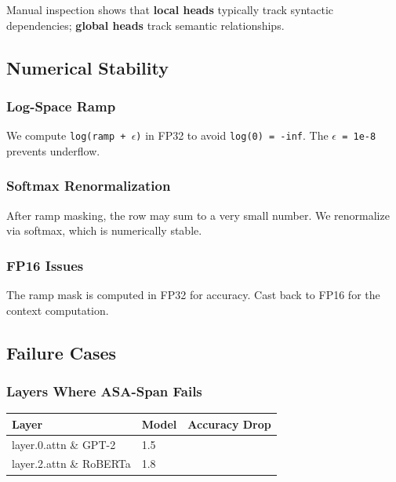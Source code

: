 Manual inspection shows that \textbf{local heads} typically track syntactic 
dependencies; \textbf{global heads} track semantic relationships.

\subsection{Numerical Stability}

\subsubsection{Log-Space Ramp}

We compute \texttt{log(ramp + $\epsilon$)} in FP32 to avoid \texttt{log(0) = -inf}. The \texttt{$\epsilon$ = 1e-8} 
prevents underflow.

\subsubsection{Softmax Renormalization}

After ramp masking, the row may sum to a very small number. We renormalize 
via softmax, which is numerically stable.

\subsubsection{FP16 Issues}

The ramp mask is computed in FP32 for accuracy. Cast back to FP16 for the 
context computation.

\subsection{Failure Cases}

\subsubsection{Layers Where ASA-Span Fails}

\begin{table}[H]
\centering
\small
\begin{tabular}{lll}
\toprule
\textbf{Layer} & \textbf{Model} & \textbf{Accuracy Drop} \\
\midrule
layer.0.attn \& GPT-2 & 1.5 \\
layer.2.attn \& RoBERTa & 1.8 \\
\bottomrule
\end{tabular}
\end{table}


